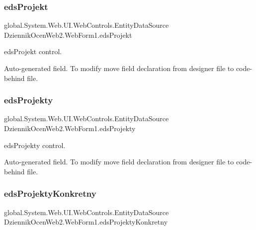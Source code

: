 \subsubsection{\texorpdfstring{eds\+Projekt}{edsProjekt}}
{\footnotesize\ttfamily global.\+System.\+Web.\+U\+I.\+Web\+Controls.\+Entity\+Data\+Source Dziennik\+Ocen\+Web2.\+Web\+Form1.\+eds\+Projekt\hspace{0.3cm}{\ttfamily [protected]}}



eds\+Projekt control. 

Auto-\/generated field. To modify move field declaration from designer file to code-\/behind file. \mbox{\label{class_dziennik_ocen_web2_1_1_web_form1_a32e1d11a35d684b6ab04cae7227c87f9}} 
\subsubsection{\texorpdfstring{eds\+Projekty}{edsProjekty}}
{\footnotesize\ttfamily global.\+System.\+Web.\+U\+I.\+Web\+Controls.\+Entity\+Data\+Source Dziennik\+Ocen\+Web2.\+Web\+Form1.\+eds\+Projekty\hspace{0.3cm}{\ttfamily [protected]}}



eds\+Projekty control. 

Auto-\/generated field. To modify move field declaration from designer file to code-\/behind file. \mbox{\label{class_dziennik_ocen_web2_1_1_web_form1_a6a1fedb3c8893198f5063d95b0996840}} 
\subsubsection{\texorpdfstring{eds\+Projekty\+Konkretny}{edsProjektyKonkretny}}
{\footnotesize\ttfamily global.\+System.\+Web.\+U\+I.\+Web\+Controls.\+Entity\+Data\+Source Dziennik\+Ocen\+Web2.\+Web\+Form1.\+eds\+Projekty\+Konkretny\hspace{0.3cm}{\ttfamily [protected]}}



